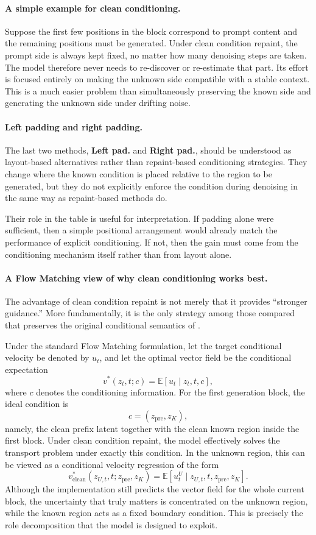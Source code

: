 \paragraph{A simple example for clean conditioning.}
Suppose the first few positions in the block correspond to prompt content and the remaining positions must be generated. Under clean condition repaint, the prompt side is always kept fixed, no matter how many denoising steps are taken. The model therefore never needs to re-discover or re-estimate that part. Its effort is focused entirely on making the unknown side compatible with a stable context. This is a much easier problem than simultaneously preserving the known side and generating the unknown side under drifting noise.

\paragraph{Left padding and right padding.}
The last two methods, \textbf{Left pad.} and \textbf{Right pad.}, should be understood as layout-based alternatives rather than repaint-based conditioning strategies. They change where the known condition is placed relative to the region to be generated, but they do not explicitly enforce the condition during denoising in the same way as repaint-based methods do.

Their role in the table is useful for interpretation. If padding alone were sufficient, then a simple positional arrangement would already match the performance of explicit conditioning. If not, then the gain must come from the conditioning mechanism itself rather than from layout alone.

\paragraph{A Flow Matching view of why clean conditioning works best.}
The advantage of clean condition repaint is not merely that it provides ``stronger guidance.'' More fundamentally, it is the only strategy among those compared that preserves the original conditional semantics of \method.

Under the standard Flow Matching formulation, let the target conditional velocity be denoted by \(u_t\), and let the optimal vector field be the conditional expectation
\[
v^*(z_t,t;c)=\mathbb{E}[u_t \mid z_t,t,c],
\]
where \(c\) denotes the conditioning information. For the first generation block, the ideal condition is
\[
c=(z_{\mathrm{pre}}, z_K),
\]
namely, the clean prefix latent together with the clean known region inside the first block. Under clean condition repaint, the model effectively solves the transport problem under exactly this condition. In the unknown region, this can be viewed as a conditional velocity regression of the form
\[
v^*_{\mathrm{clean}}(z_{U,t}, t; z_{\mathrm{pre}}, z_K)
=
\mathbb{E}[u_t^U \mid z_{U,t}, t, z_{\mathrm{pre}}, z_K].
\]
Although the implementation still predicts the vector field for the whole current block, the uncertainty that truly matters is concentrated on the unknown region, while the known region acts as a fixed boundary condition. This is precisely the role decomposition that the model is designed to exploit.

